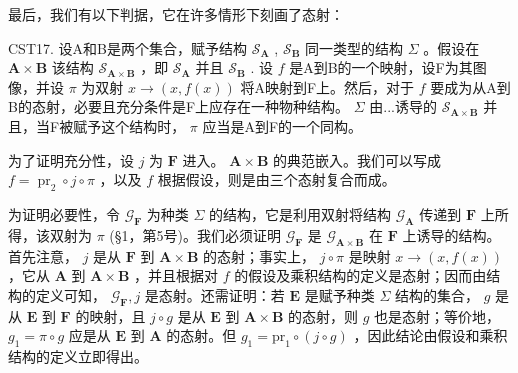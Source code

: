 最后，我们有以下判据，它在许多情形下刻画了态射：

CST17. 设A和B是两个集合，赋予结构 \(\mathcal{S}_{\mathbf{A}}\) , \(\mathcal{S}_{\mathbf{B}}\) 同一类型的结构 \(\Sigma\) 。假设在 \(\mathbf{A} \times \mathbf{B}\) 该结构 \(\mathcal{S}_{\mathbf{A} \times \mathbf{B}}\) ，即 \(\mathcal{S}_{\mathbf{A}}\) 并且 \(\mathcal{S}_{\mathbf{B}}\) . 设 \(f\) 是A到B的一个映射，设F为其图像，并设 \(\pi\) 为双射 \(x \to (x, f(x))\) 将A映射到F上。然后，对于 \(f\) 要成为从A到B的态射，必要且充分条件是F上应存在一种物种结构。 \(\Sigma\) 由...诱导的 \(\mathcal{S}_{\mathbf{A} \times \mathbf{B}}\) 并且，当F被赋予这个结构时， \(\pi\) 应当是A到F的一个同构。

为了证明充分性，设 \(j\) 为 \(\mathbf{F}\) 进入。 \(\mathbf{A} \times \mathbf{B}\) 的典范嵌入。我们可以写成 \(f = \operatorname{pr}_2 \circ j \circ \pi\) ，以及 \(f\) 根据假设，则是由三个态射复合而成。

为证明必要性，令 \(\mathcal{G}_{\mathbf{F}}\) 为种类 \(\Sigma\) 的结构，它是利用双射将结构 \(\mathcal{G}_{\mathbf{A}}\) 传递到 \(\mathbf{F}\) 上所得，该双射为 \(\pi\) (§1，第5号)。我们必须证明 \(\mathcal{G}_{\mathbf{F}}\) 是 \(\mathcal{G}_{\mathbf{A} \times \mathbf{B}}\) 在 \(\mathbf{F}\) 上诱导的结构。首先注意， \(j\) 是从 \(\mathbf{F}\) 到 \(\mathbf{A} \times \mathbf{B}\) 的态射；事实上， \(j \circ \pi\) 是映射 \(x \to (x, f(x))\) ，它从 \(\mathbf{A}\) 到 \(\mathbf{A} \times \mathbf{B}\) ，并且根据对 \(f\) 的假设及乘积结构的定义是态射；因而由结构的定义可知， \(\mathcal{G}_{\mathbf{F}}, j\) 是态射。还需证明：若 \(\mathbf{E}\) 是赋予种类 \(\Sigma\) 结构的集合， \(g\) 是从 \(\mathbf{E}\) 到 \(\mathbf{F}\) 的映射，且 \(j \circ g\) 是从 \(\mathbf{E}\) 到 \(\mathbf{A} \times \mathbf{B}\) 的态射，则 \(g\) 也是态射；等价地， \(g_{1} = \pi \circ g\) 应是从 \(\mathbf{E}\) 到 \(\mathbf{A}\) 的态射。但 \(g_{1} = \mathrm{pr}_{1} \circ (j \circ g)\) ，因此结论由假设和乘积结构的定义立即得出。


